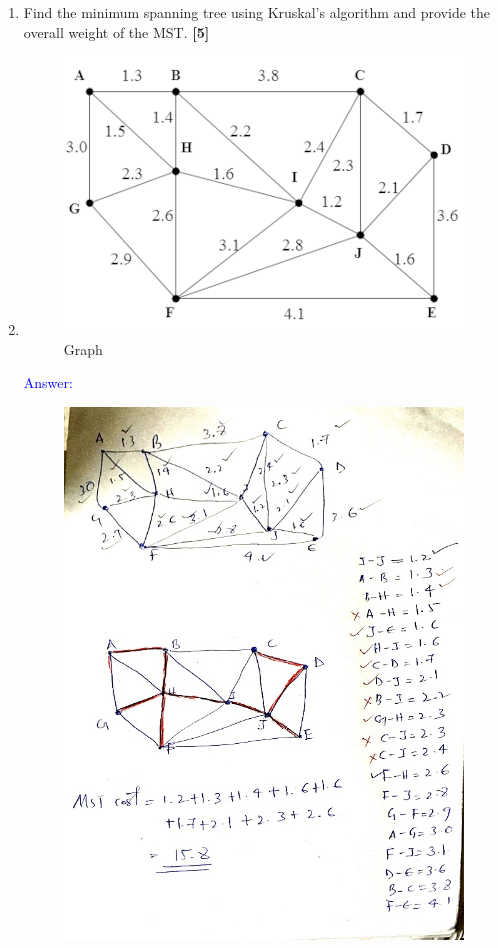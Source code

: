 \documentclass[12pt ,a4paper]{exam}
\begin{document}
\begin{enumerate}[start=1,label={\bfseries Q\arabic*)}]
\begin{figure}[h]
		\label{fig:screenshot-2020-12-27-at-12}
	\end{figure}
	\pagebreak
		\item Find the minimum spanning tree using Kruskal’s algorithm and provide the overall weight of the MST. \hfill\textbf{[5]}
	\item []
	\begin{figure}[h]
		\centering
		\includegraphics[width=0.4\linewidth]{L2FwcGhvc3RpbmdfcHJvZC9ibG9icy9BRW5CMlVvRjE0bjJhd2cyaXNleU4ybUhLZWxBSDlaQlBzX3Z6NjZONXEzMmFQZTdaQ2cwVlFOQWozdHNBNWdXemFIXzhxSXhwcU1lRDFIbnlDeHJNUGZzSVZpTW4zeDhpdy5idmJfeUlpOVkyNlVLSEdi_400_400}
		\caption{Graph}
		\label{fig:l2fwcghvc3rpbmdfchjvzc9ibg9icy9brw5cmlvvrje0bjjhd2cyaxnleu4ybuhlzwxbsdlaqlbzx3z6njzonxezmmfqztdaq2cwvlfoqwozdhnbnwdxemfixzhxsxhwcu1lrdfibnldehjnugzzsvzptw4zedhpdy5idmjfeulpovkynlvlsedi400400}
	\end{figure}
    \textcolor{blue}{Answer: } 
    \begin{figure}
    	\centering
    	\includegraphics[width=1\linewidth]{1609071225.352696}

\end{figure}
\end{enumerate}
\end{document}
